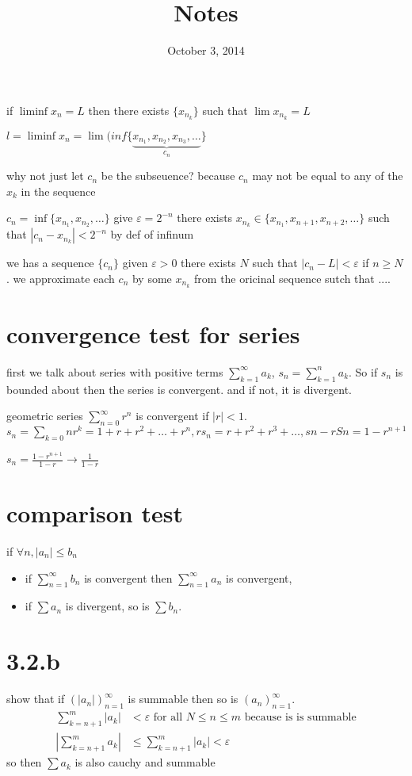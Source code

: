 \documentclass[letterpaper]{article}
\begin{document}
\title{Notes}
\date{October 3, 2014}
\maketitle
if $\liminf x_n=L$ then there exists $\{x_{n_k}\}$ such that $\lim x_{n_k}=L$

$l=\liminf x_n=\lim(inf\{\underbrace{x_{n_1},x_{n_2},x_{n_3},\dots}_{c_n}\}$

why not just let $c_n$ be the subseuence? because $c_n$ may not be equal to any of the $x_k$ in the sequence

$c_n=\inf\{x_{n_1},x_{n_2},\dots\}$ give $\varepsilon=2^{-n}$ there exists $x_{n_k}\in\{x_{n_1},x_{n+1},x_{n+2},\dots\}$ such that $\left\lvert c_n-x_{n_k}\right\rvert<2^{-n}$ by def of infinum

we has a sequence $\{c_n\}$ given $\varepsilon>0$ there exists $N$ such that $\left\lvert c_n-L\right\rvert<\varepsilon$ if $n\ge N$. we approximate each $c_n$ by some $x_{n_k}$ from the oricinal sequence sutch that ....

\section*{convergence test for series}
first we talk about series with positive terms $\sum\limits_{k=1}^\infty{a_k}$, $s_n=\sum\limits_{k=1}^n{a_k}$. So if $s_n$ is bounded about then the series is convergent. and if not, it is divergent.

geometric series $\sum\limits_{n=0}^\infty{r^n}$ is convergent if $\left\lvert r\right\rvert<1$. $s_n=\sum\limits_{k=0}n{r^k}=1+r+r^2+\dots+r^n, rs_n=r+r^2+r^3+\dots, sn-rSn=1-r^{n+1}$

$s_n=\frac{1-r^{n+1}}{1-r}\to\frac{1}{1-r}$


\section*{comparison test}
if $\forall n, |a_n|\le b_n$
\begin{itemize}
\item
  if $\sum\limits_{n=1}^\infty{b_n}$ is convergent then $\sum\limits_{n=1}^\infty{a_n}$ is convergent,
  \item
  if $\sum\limits{a_n}$ is divergent, so is $\sum\limits{b_n}$.
\end{itemize}
\section*{3.2.b}
show that if $\left(|a_n|\right)_{n=1}^\infty$ is summable then so is $\left(a_n\right)_{n=1}^\infty$.
\begin{align*}
  \sum\limits_{k=n+1}^m{|a_k|}&<\varepsilon\text{ for all }N\le n\le m \text{ because is is summable}\\
  \left\lvert\sum\limits_{k=n+1}^m{a_k}\right\rvert&\le\sum\limits_{k=n+1}^m{|a_k|}<\varepsilon
\end{align*}
so then $\sum\limits{a_k}$ is also cauchy and summable
\end{document}
